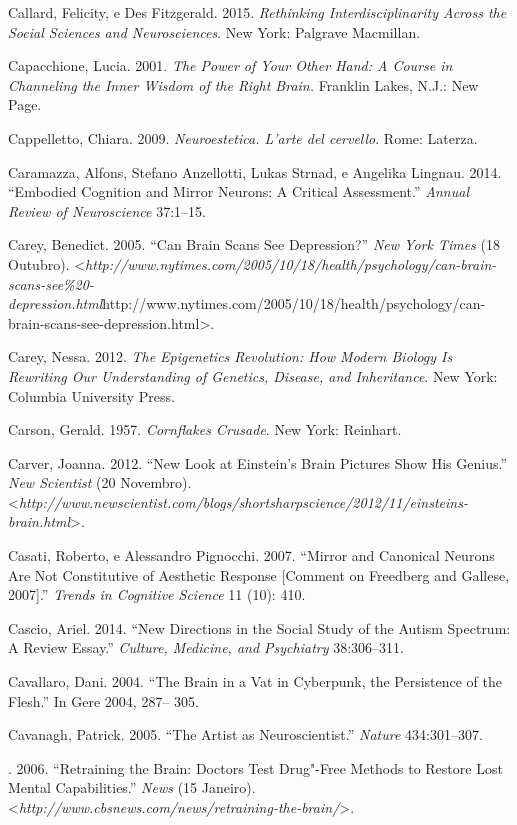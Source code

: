 Callard, Felicity, e Des Fitzgerald. 2015. \emph{Rethinking
Interdisciplinarity Across the Social Sciences and Neurosciences}. New
York: Palgrave Macmillan.

Capacchione, Lucia. 2001. \emph{The Power of Your Other Hand: A Course
in Channeling the Inner Wisdom of the Right Brain.} Franklin Lakes,
N.J.: New Page.

Cappelletto, Chiara. 2009. \emph{Neuroestetica. L'arte del cervello}.
Rome: Laterza.

Caramazza, Alfons, Stefano Anzellotti, Lukas Strnad, e Angelika Lingnau.
2014. ``Embodied Cognition and Mirror Neurons: A Critical Assessment.''
\emph{Annual Review of Neuroscience} 37:1--15.

Carey, Benedict. 2005. ``Can Brain Scans See Depression?'' \emph{New
York Times} (18 Outubro).
\textless{}\emph{http://www.nytimes.com/2005/10/18/health/psychology/can-brain-scans-see\%20-depression.html}{http://www.nytimes.com/2005/10/18/health/psychology/can-brain-scans-see-depression.html}\textgreater{}.

Carey, Nessa. 2012. \emph{The Epigenetics Revolution: How Modern Biology
Is Rewriting Our Understanding of Genetics, Disease, and Inheritance}.
New York: Columbia University Press.

Carson, Gerald. 1957. \emph{Cornflakes Crusade}. New York: Reinhart.

Carver, Joanna. 2012. ``New Look at Einstein's Brain Pictures Show His
Genius.'' \emph{New Scientist} (20 Novembro).
\textless{}\emph{http://www.newscientist.com/blogs/shortsharpscience/2012/11/einsteins-brain.html}\textgreater{}.

Casati, Roberto, e Alessandro Pignocchi. 2007. ``Mirror and Canonical
Neurons Are Not Constitutive of Aesthetic Response {[}Comment on
Freedberg and Gallese, 2007{]}.'' \emph{Trends in Cognitive Science} 11
(10): 410.

Cascio, Ariel. 2014. ``New Directions in the Social Study of the Autism
Spectrum: A Review Essay.'' \emph{Culture, Medicine, and Psychiatry}
38:306--311.

Cavallaro, Dani. 2004. ``The Brain in a Vat in Cyberpunk, the
Persistence of the Flesh.'' In Gere 2004, 287-- 305.

Cavanagh, Patrick. 2005. ``The Artist as Neuroscientist.'' \emph{Nature}
434:301--307.

. 2006. ``Retraining the Brain: Doctors Test Drug"-Free Methods to
Restore Lost Mental Capabilities.'' \emph{ News} (15 Janeiro).
\textless{}\emph{http://www.cbsnews.com/news/retraining-the-brain/}\textgreater{}.

